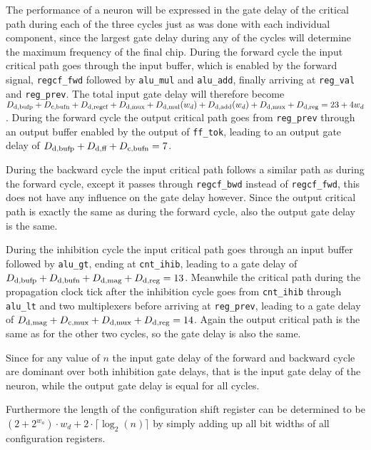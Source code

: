 The performance of a neuron will be expressed in the gate delay of the critical path during each of the three cycles just as was done with each individual component, since the largest gate delay during any of the cycles will determine the maximum frequency of the final chip. During the forward cycle the input critical path goes through the input buffer, which is enabled by the forward signal, \texttt{regcf\_fwd} followed by \texttt{alu\_mul} and \texttt{alu\_add}, finally arriving at \texttt{reg\_val} and \texttt{reg\_prev}. The total input gate delay will therefore become $\f{D}{d}{bufp} + \f{D}{c}{bufn} + \f{D}{d}{regcf} + \f{D}{d}{mux} + \f{D}{d}{mul}(w_{d}) + \f{D}{d}{add}(w_{d}) + \f{D}{d}{mux} + \f{D}{d}{reg} = 23 + 4w_{d}$. During the forward cycle the output critical path goes from \texttt{reg\_prev} through an output buffer enabled by the output of \texttt{ff\_tok}, leading to an output gate delay of $\f{D}{d}{bufp} + \f{D}{d}{ff} + \f{D}{c}{bufn} = 7$.

During the backward cycle the input critical path follows a similar path as during the forward cycle, except it passes through \texttt{regcf\_bwd} instead of \texttt{regcf\_fwd}, this does not have any influence on the gate delay however. Since the output critical path is exactly the same as during the forward cycle, also the output gate delay is the same.

During the inhibition cycle the input critical path goes through an input buffer followed by \texttt{alu\_gt}, ending at \texttt{cnt\_ihib}, leading to a gate delay of $\f{D}{d}{bufp} + \f{D}{d}{bufn} + \f{D}{d}{mag} + \f{D}{d}{reg} = 13$. Meanwhile the critical path during the propagation clock tick after the inhibition cycle goes from \texttt{cnt\_ihib} through \texttt{alu\_lt} and two multiplexers before arriving at \texttt{reg\_prev}, leading to a gate delay of $\f{D}{d}{mag} + \f{D}{c}{mux} + \f{D}{d}{mux} + \f{D}{d}{reg} = 14$. Again the output critical path is the same as for the other two cycles, so the gate delay is also the same.

Since for any value of $n$ the input gate delay of the forward and backward cycle are dominant over both inhibition gate delays, that is the input gate delay of the neuron, while the output gate delay is equal for all cycles.

Furthermore the length of the configuration shift register can be determined to be $(2 + 2^{w_{a}}) \cdot w_{d} + 2 \cdot \lceil\log_{2}(n)\rceil$ by simply adding up all bit widths of all configuration registers.

